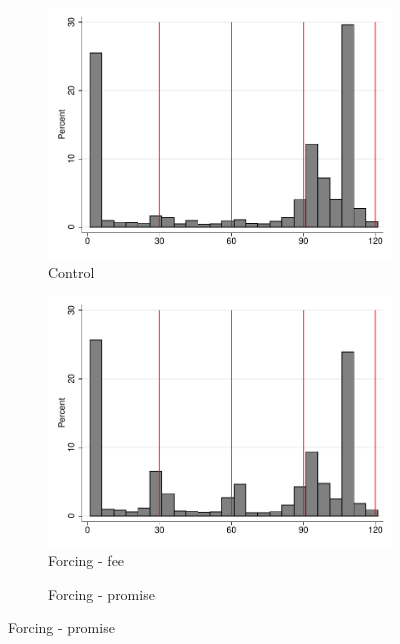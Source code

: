 \documentclass[11pt]{article}
\begin{document}
\begin{figure}[H]
        \caption{Histogram of payments}
    \label{HistPayments}
    \begin{center}
    \begin{subfigure}{.31\textwidth}
    \caption{Control}
        \centering
        \includegraphics[width=\textwidth]{Figuras/hist_payments_pro_1.pdf}
    \end{subfigure}
    \begin{subfigure}{.31\textwidth}
    \caption{Forcing - fee}
        \centering
        \includegraphics[width=\textwidth]{Figuras/hist_payments_pro_2.pdf}
    \end{subfigure}   
     \begin{subfigure}{.31\textwidth}
    \caption{Forcing - promise}

\end{subfigure}
\end{center}
\end{figure}
\end{document}
